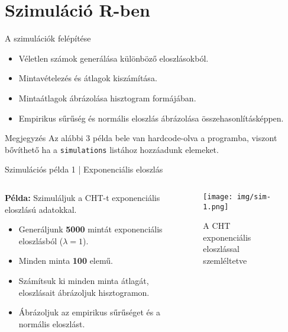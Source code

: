 \documentclass[aspectratio=169,12pt]{beamer}
\begin{document}
	\section{Szimuláció R-ben}
	\begin{frame}{A szimulációk felépítése}
		\begin{itemize}
			\item Véletlen számok generálása különböző eloszlásokból.
			\item Mintavételezés és átlagok kiszámítása.
			\item Mintaátlagok ábrázolása hisztogram formájában.
			\item Empirikus sűrűség és normális eloszlás ábrázolása összehasonlításképpen.
		\end{itemize}
		\begin{block}{Megjegyzés}
			Az alábbi 3 példa bele van hardcode-olva a programba, viszont bővíthető ha a \texttt{simulations} listához hozzáadunk elemeket.
		\end{block}
	\end{frame}
	
	\begin{frame}{Szimulációs példa 1 | Exponenciális eloszlás}
		\begin{columns}
			\begin{column}{0.5\textwidth}
				\textbf{Példa:} Szimuláljuk a CHT-t exponenciális eloszlású adatokkal.
				\begin{itemize}
					\item Generáljunk \textbf{5000} mintát exponenciális eloszlásból (\(\lambda = 1\)).
					\item Minden minta \textbf{100} elemű.
					\item Számítsuk ki minden minta átlagát, eloszlásait ábrázoljuk hisztogramon.
					\item Ábrázoljuk az empirikus sűrűséget és a normális eloszlást.
				\end{itemize}
			\end{column}
			\begin{column}{0.5\textwidth}
				\begin{figure}
					\texttt{[image: img/sim-1.png]}
					\caption{A CHT exponenciális eloszlással szemléltetve}
				\end{figure}
			\end{column}
		\end{columns}
	\end{frame}
	
\end{document}
